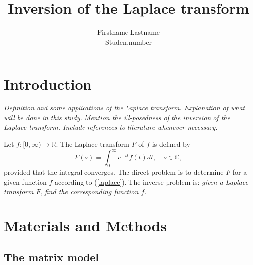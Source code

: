 \documentclass[12pt,a4]{article}
\title{Inversion of the Laplace transform}
\author{Firstname Lastname\\Studentnumber}
\newcommand{\R}{{\mathbb R}}
\newcommand{\C}{{\mathbb C}}
\begin{document}
\maketitle

\section{Introduction}

{\em Definition and some applications of the Laplace transform. Explanation of what will be done in this study. Mention the ill-posedness of the inversion of the Laplace transform. Include references to literature whenever necessary.}

Let $f:[0,\infty)\rightarrow \R$. The Laplace transform $F$ of $f$ is defined by
\begin{equation}\label{laplace}
 F(s) = \int_0^\infty e^{-st}f(t)dt,\quad s\in\C ,
\end{equation}
provided that the integral converges. The direct problem is to determine $F$ for a given function $f$ according to (\ref{laplace}). The inverse problem is: {\em given a Laplace transform $F$, find the corresponding function $f$.}



\section{Materials and Methods}\label{sec:methods}

\subsection{The matrix model}
\end{document}
